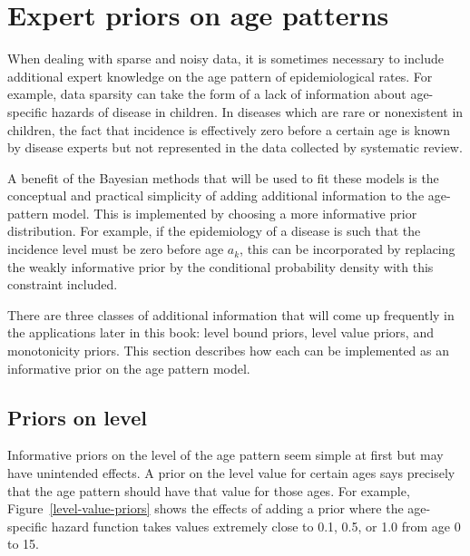 \chapter{Expert priors on age patterns}
\label{theory-expert_priors}

When dealing with sparse and noisy data, it is sometimes necessary to
include additional expert knowledge on the age pattern of
epidemiological rates.  For example, data sparsity can take the form
of a lack of information about age-specific hazards of disease in children.  In
diseases which are rare or nonexistent in children, the fact that incidence is
effectively zero before a certain age is known by disease experts but
not represented in the data collected by systematic review.

A benefit of the Bayesian methods that will be used to fit these
models is the conceptual and practical simplicity of adding additional
information to the age-pattern model.  This is implemented by choosing
a more informative prior distribution.  For example, if the
epidemiology of a disease is such that the incidence level must be
zero before age $a_k$, this can be incorporated by replacing the
weakly informative prior by the conditional probability density with
this constraint included.

There are three classes of additional information that will come up
frequently in the applications later in this book: level bound priors,
level value priors, and monotonicity priors. This section describes
how each can be implemented as an informative prior on the age pattern
model.


\section{Priors on level}

Informative priors on the level of the age pattern seem simple at
first but may have unintended effects.  A prior on the level value for
certain ages says precisely that the age pattern should have that
value for those ages.  For example, Figure~\ref{level-value-priors}
shows the effects of adding a prior where the age-specific hazard function takes values extremely
close to 0.1, 0.5, or 1.0 from age 0 to 15.


